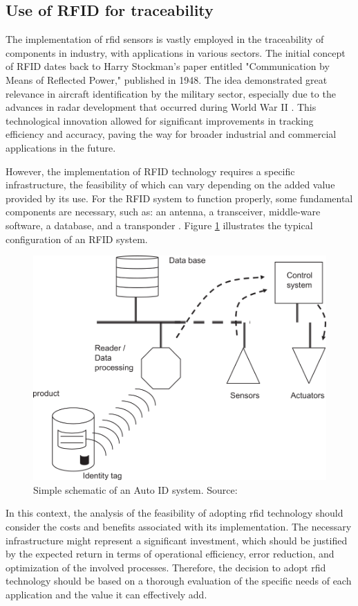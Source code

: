 \subsection{Use of RFID for traceability}\label{RFIDtraceability}

The implementation of \acrfull{rfid} sensors is vastly employed in the traceability of components in industry, with applications in various \cite{ZHONG2013, Qu2012-hw, Anssens2011, Engelhardt2012, Rida2007} sectors. The initial concept of RFID dates back to Harry Stockman's paper entitled "Communication by Means of Reflected Power," published in 1948. The idea demonstrated great relevance in aircraft identification by the military sector, especially due to the advances in radar development that occurred during World War II \cite{Landt2005}. This technological innovation allowed for significant improvements in tracking efficiency and accuracy, paving the way for broader industrial and commercial applications in the future.

However, the implementation of RFID technology requires a specific infrastructure, the feasibility of which can vary depending on the added value provided by its use. For the RFID system to function properly, some fundamental components are necessary, such as: an antenna, a transceiver, middle-ware software, a database, and a transponder \cite{MCFARLANE2003365}. Figure \ref{fig:rfid} illustrates the typical configuration of an RFID system.

\begin{figure}[h!]
    \centering
    \includegraphics[width=.65\linewidth]{images/Development/chap3/g1126.png}
        \caption{Simple schematic of an Auto ID system. Source: \cite{MCFARLANE2003365}}

    \label{fig:rfid}
\end{figure}

In this context, the analysis of the feasibility of adopting \acrshort{rfid} technology should consider the costs and benefits associated with its implementation. The necessary infrastructure might represent a significant investment, which should be justified by the expected return in terms of operational efficiency, error reduction, and optimization of the involved processes. Therefore, the decision to adopt \acrshort{rfid} technology should be based on a thorough evaluation of the specific needs of each application and the value it can effectively add.


